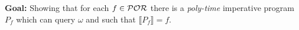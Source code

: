 \documentclass[xcolor={x11names}]{beamer}
\begin{document}
\begin{frame}
\begin{overprint}
  \medskip

  \textbf{Goal: } Showing that for each $f \in \mathcal{POR}$ there is a \emph{poly-time} imperative program $P_f$ which can query $\omega$ and such that $\llbracket P_f\rrbracket = f$.

  \medskip




\end{overprint}
\end{frame}
\end{document}
